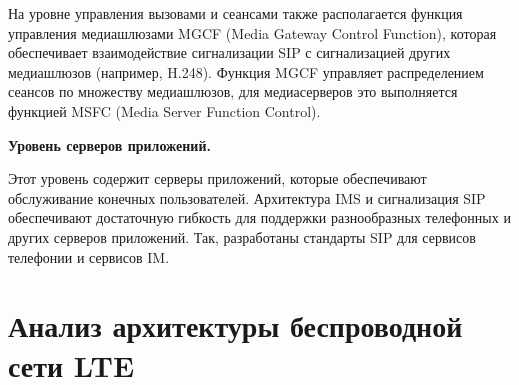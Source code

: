 На уровне управления вызовами и сеансами также располагается функция управления медиашлюзами MGCF (Media Gateway Control Function), которая обеспечивает взаимодействие сигнализации SIP с сигнализацией других медиашлюзов (например, H.248). Функция MGCF управляет распределением сеансов по множеству медиашлюзов, для медиасерверов это выполняется функцией MSFC (Media Server Function Control).

\textbf{Уровень серверов приложений.}

Этот уровень содержит серверы приложений, которые обеспечивают обслуживание конечных пользователей. Архитектура IMS и сигнализация SIP обеспечивают достаточную гибкость для поддержки разнообразных телефонных и других серверов приложений. Так, разработаны стандарты SIP для сервисов телефонии и сервисов IM.









\section{Анализ архитектуры беспроводной сети LTE} \label{sect1_2}
